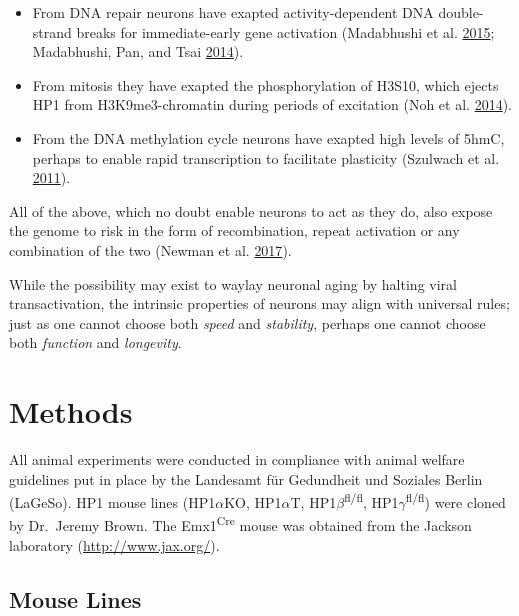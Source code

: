 \documentclass[onehalf,12pt]{beavtex}
\providecommand{\tightlist}{%
  \setlength{\itemsep}{0pt}\setlength{\parskip}{0pt}}
\begin{document}
  \begin{itemize}
  \tightlist
  \item
    From DNA repair neurons have exapted activity-dependent DNA
    double-strand breaks for immediate-early gene activation (Madabhushi
    et al.
    \protect\hyperlink{ref-MadabhushiActivityInducedDNABreaks2015}{2015};
    Madabhushi, Pan, and Tsai
    \protect\hyperlink{ref-MadabhushiDNADamageIts2014}{2014}).
  \item
    From mitosis they have exapted the phosphorylation of H3S10, which
    ejects HP1 from H3K9me3-chromatin during periods of excitation (Noh et
    al.
    \protect\hyperlink{ref-NohATRXtoleratesactivitydependent2014}{2014}).
  \item
    From the DNA methylation cycle neurons have exapted high levels of
    5hmC, perhaps to enable rapid transcription to facilitate plasticity
    (Szulwach et al.
    \protect\hyperlink{ref-Szulwach5hmCmediatedepigenetic2011}{2011}).
  \end{itemize}
  
  All of the above, which no doubt enable neurons to act as they do, also
  expose the genome to risk in the form of recombination, repeat
  activation or any combination of the two (Newman et al.
  \protect\hyperlink{ref-NewmanActivityDEPendentTransposition2017}{2017}).
  
  While the possibility may exist to waylay neuronal aging by halting
  viral transactivation, the intrinsic properties of neurons may align
  with universal rules; just as one cannot choose both \emph{speed} and
  \emph{stability}, perhaps one cannot choose both \emph{function} and
  \emph{longevity}.
  
  \chapter{Methods}\label{methods}
  
  All animal experiments were conducted in compliance with animal welfare
  guidelines put in place by the Landesamt für Gedundheit und Soziales
  Berlin (LaGeSo). HP1 mouse lines (HP1\(\alpha\)KO, HP1\(\alpha\)T,
  HP1\(\beta\)\textsuperscript{fl/fl},
  HP1\(\gamma\)\textsuperscript{fl/fl}) were cloned by Dr.~Jeremy Brown.
  The Emx1\textsuperscript{Cre} mouse was obtained from the Jackson
  laboratory (\url{http://www.jax.org/}).
  
  \section{Mouse Lines}\label{mouse-lines}
  
\end{document}
